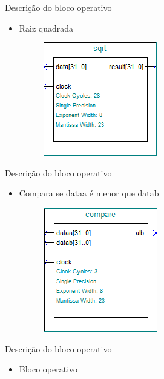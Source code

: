 \documentclass[11pt]{beamer}
\begin{document}
\begin{frame}{Descrição do bloco operativo}
	\begin{itemize}
	\item Raiz quadrada
	\begin{figure}[ht]
	\centering
	\includegraphics[width=.5\textwidth]{sqrt}
	\label{fig:sqrt}
	\end{figure}
	\end{itemize}
\end{frame}

\begin{frame}{Descrição do bloco operativo}
	\begin{itemize}
	\item Compara se dataa é menor que datab
	\begin{figure}[ht]
	\centering
	\includegraphics[width=.5\textwidth]{compare}
	\label{fig:compare}
	\end{figure}
	\end{itemize}
\end{frame}

\begin{frame}{Descrição do bloco operativo}
	\begin{itemize}
	\item Bloco operativo
	\end{itemize}
\end{frame}
\end{document}
